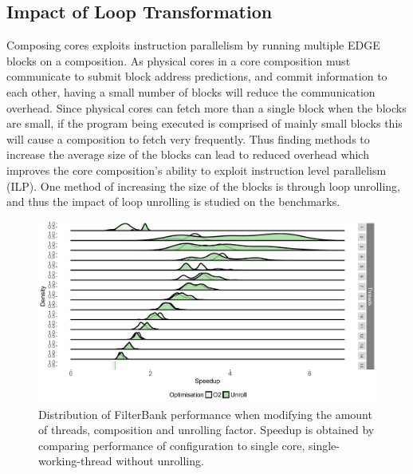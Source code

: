 \subsection{Impact of Loop Transformation}
Composing cores exploits instruction parallelism by running multiple EDGE blocks on a composition.
As physical cores in a core composition must communicate to submit block address predictions, and commit information to each other, having a small number of blocks will reduce the communication overhead.
Since physical cores can fetch more than a single block when the blocks are small, if the program being executed is comprised of mainly small blocks this will cause a composition to fetch very frequently.
Thus finding methods to increase the average size of the blocks can lead to reduced overhead which improves the core composition's ability to exploit instruction level parallelism (ILP).
One method of increasing the size of the blocks is through loop unrolling, and thus the impact of loop unrolling is studied on the benchmarks.

\begin{figure}[t]
  \includegraphics[width=1\textwidth]{streamit-paper/graphics/filterbank_unroll2.pdf}
  \vspace{-1em}
  \caption{Distribution of FilterBank performance when modifying the amount of threads, composition and unrolling factor. Speedup is obtained by comparing performance of configuration to single core, single-working-thread without unrolling.}\label{fig:fbunroll}  \vspace{-1em}

\end{figure}

